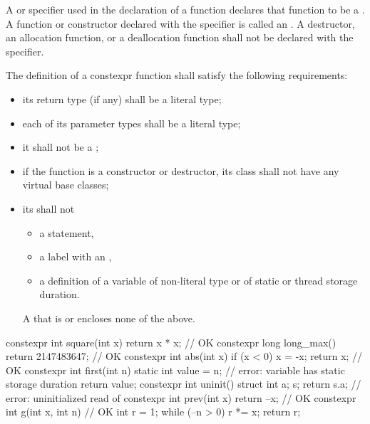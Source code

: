 \pnum
A  or  specifier
used in the declaration of a function
declares that function to be
a .
A function or constructor declared with the  specifier
is called an .
A destructor, an allocation function, or a deallocation function
shall not be declared with the  specifier.

\pnum
{}%
%
The definition of a constexpr function shall satisfy the following
requirements:
\begin{itemize}
\item
its return type (if any) shall be a literal type;

\item
each of its parameter types shall be a literal type;

\item
it shall not be a ;

\item
if the function is a constructor or destructor,
its class shall not have any virtual base classes;

\item
its  shall not 
\begin{itemize}
\item a  statement,
\item a label with an ,
\item a definition of a variable
of non-literal type or
of static or thread storage duration.
\end{itemize}
\begin{note}
A  that is  or 
encloses none of the above.
\end{note}
\end{itemize}

\begin{example}
\begin{codeblock}
constexpr int square(int x)
  { return x * x; }             // OK
constexpr long long_max()
  { return 2147483647; }        // OK
constexpr int abs(int x) {
  if (x < 0)
    x = -x;
  return x;                     // OK
}
constexpr int first(int n) {
  static int value = n;         // error: variable has static storage duration
  return value;
}
constexpr int uninit() {
  struct { int a; } s;
  return s.a;                   // error: uninitialized read of 
}
constexpr int prev(int x)
  { return --x; }               // OK
constexpr int g(int x, int n) { // OK
  int r = 1;
  while (--n > 0) r *= x;
  return r;
}
\end{codeblock}
\end{example}

